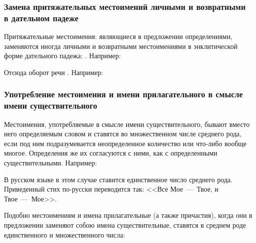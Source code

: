 \documentclass[11pt,a4paper,oneside]{memoir}
\begin{document}
    \bigskip{}
    
                \subsubsection{Замена притяжательных местоимений личными и возвратными в дательном падеже}

    Притяжательные местоимения: {} являющиеся в предложении определениями, заменяются иногда личными и возвратными местоимениями в энклитической форме дательного падежа: {}. Например:
    
    \bigskip{}
    
    Отсюда оборот речи {}. Например:
    
    \bigskip{}

                \subsubsection{Употребление местоимения и имени прилагательного в смысле имени существительного}

    Местоимения, употребляемые в смысле имени существительного, бывают вместо него определяемым словом и ставятся во множественном числе среднего рода, если под ним подразумевается неопределенное количество или что-либо вообще многое. Определения же их согласуются с ними, как с определенными существительными. Например:
    
    \bigskip{}
    
    В русском языке в этом случае ставится единственное число среднего рода. Приведенный стих по-русски переводится так: <<Все Мое~---~Твое, и Твое~---~Мое>>.
    
    Подобно местоимениям и имена прилагательные (а также причастия), когда они в предложении заменяют собою имена существительные, ставятся в среднем роде единственного и множественного числа:
    
    \bigskip{}
\end{document}
